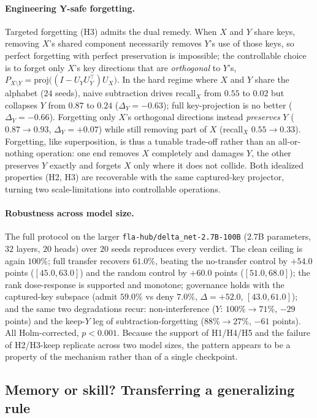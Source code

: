 \documentclass[11pt]{article}
\theoremstyle{definition}
\begin{document}
\paragraph{Engineering Y-safe forgetting.}
Targeted forgetting (H3) admits the dual remedy. When $X$ and $Y$ share keys, removing $X$'s shared component necessarily removes $Y$'s use of those keys, so perfect forgetting with perfect preservation is impossible; the controllable choice is to forget only $X$'s key directions that are \emph{orthogonal} to $Y$'s, $P_{X\setminus Y}=\mathrm{proj}\big((I-U_Y U_Y^\top)U_X\big)$. In the hard regime where $X$ and $Y$ share the alphabet ($24$ seeds), naive subtraction drives recall$_X$ from $0.55$ to $0.02$ but collapses $Y$ from $0.87$ to $0.24$ ($\Delta_Y=-0.63$); full key-projection is no better ($\Delta_Y=-0.66$). Forgetting only $X$'s orthogonal directions instead \emph{preserves} $Y$ ($0.87\to0.93$, $\Delta_Y=+0.07$) while still removing part of $X$ (recall$_X$ $0.55\to0.33$). Forgetting, like superposition, is thus a tunable trade-off rather than an all-or-nothing operation: one end removes $X$ completely and damages $Y$, the other preserves $Y$ exactly and forgets $X$ only where it does not collide. Both idealized properties (H2, H3) are recoverable with the same captured-key projector, turning two scale-limitations into controllable operations.

\paragraph{Robustness across model size.}
The full protocol on the larger \texttt{fla-hub/delta\_net-2.7B-100B} ($2.7$B parameters, $32$ layers, $20$ heads) over $20$ seeds reproduces every verdict. The clean ceiling is again $100\%$; full transfer recovers $61.0\%$, beating the no-transfer control by $+54.0$ points ($[45.0,63.0]$) and the random control by $+60.0$ points ($[51.0,68.0]$); the rank dose-response is supported and monotone; governance holds with the captured-key subspace (admit $59.0\%$ vs deny $7.0\%$, $\Delta=+52.0$, $[43.0,61.0]$); and the same two degradations recur: non-interference ($Y$: $100\%\!\to\!71\%$, $-29$ points) and the keep-$Y$ leg of subtraction-forgetting ($88\%\!\to\!27\%$, $-61$ points). All Holm-corrected, $p<0.001$. Because the support of H1/H4/H5 and the failure of H2/H3-keep replicate across two model sizes, the pattern appears to be a property of the mechanism rather than of a single checkpoint.

\subsection{Memory or skill? Transferring a generalizing rule}
\label{sec:rule}
\end{document}

